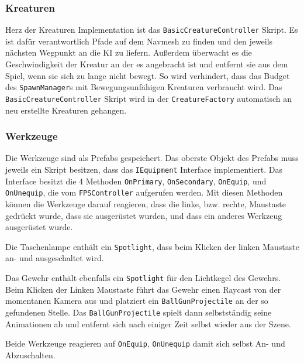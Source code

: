 \subsubsection{Kreaturen}
Herz der Kreaturen Implementation ist das \texttt{BasicCreatureController} Skript.
Es ist dafür verantwortlich Pfade auf dem Navmesh zu finden und den jeweils nächsten Wegpunkt an die KI zu liefern.
Außerdem überwacht es die Geschwindigkeit der Kreatur an der es angebracht ist und entfernt sie aus dem Spiel, wenn sie sich zu lange nicht bewegt.
So wird verhindert, dass das Budget des \texttt{SpawnManager}s mit Bewegungsunfähigen Kreaturen verbraucht wird.
Das \texttt{BasicCreatureController} Skript wird in der \texttt{CreatureFactory} automatisch an neu erstellte Kreaturen gehangen.

\subsubsection{Werkzeuge}
\label{sec:design-tools}
Die Werkzeuge sind als Prefabs gespeichert.
Das oberste Objekt des Prefabs muss jeweils ein Skript besitzen, dass das \texttt{IEquipment} Interface implementiert.
Das Interface besitzt die 4 Methoden \texttt{OnPrimary}, \texttt{OnSecondary}, \texttt{OnEquip}, und \texttt{OnUnequip}, die vom \texttt{FPSController} aufgerufen werden.
Mit diesen Methoden können die Werkzeuge darauf reagieren, dass die linke, bzw. rechte, Maustaste gedrückt wurde, dass sie ausgerüstet wurden, und dass ein anderes Werkzeug ausgerüstet wurde.

Die Taschenlampe enthält ein \texttt{Spotlight}, dass beim Klicken der linken Maustaste an- und ausgeschaltet wird.

Das Gewehr enthält ebenfalls ein \texttt{Spotlight} für den Lichtkegel des Gewehrs.
Beim Klicken der Linken Maustaste führt das Gewehr einen Raycast von der momentanen Kamera aus und platziert ein \texttt{BallGunProjectile} an der so gefundenen Stelle.
Das \texttt{BallGunProjectile} spielt dann selbstständig seine Animationen ab und entfernt sich nach einiger Zeit selbst wieder aus der Szene.

Beide Werkzeuge reagieren auf \texttt{OnEquip}, \texttt{OnUnequip} damit sich selbst An- und Abzuschalten.